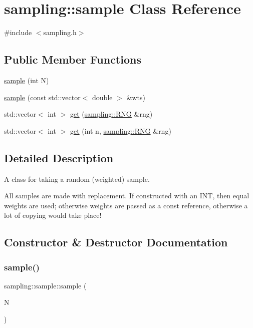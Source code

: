 \hypertarget{classsampling_1_1sample}{}\section{sampling\+:\+:sample Class Reference}
\label{classsampling_1_1sample}


{\ttfamily \#include $<$sampling.\+h$>$}

\subsection*{Public Member Functions}
\begin{DoxyCompactItemize}
\item 
\hyperlink{classsampling_1_1sample_a7c217cc7c5f9461835062a0362bec4d1}{sample} (int N)
\item 
\hyperlink{classsampling_1_1sample_aa5ce07807a24cd3387626b99b38255ad}{sample} (const std\+::vector$<$ double $>$ \&wts)
\item 
std\+::vector$<$ int $>$ \hyperlink{classsampling_1_1sample_addc486d8e1dca7d0a09be0a7fa95fc77}{get} (\hyperlink{classsampling_1_1RNG}{sampling\+::\+R\+NG} \&rng)
\item 
std\+::vector$<$ int $>$ \hyperlink{classsampling_1_1sample_ab2c4a10e7971983a8e4acdbb0ad37055}{get} (int n, \hyperlink{classsampling_1_1RNG}{sampling\+::\+R\+NG} \&rng)
\end{DoxyCompactItemize}


\subsection{Detailed Description}
A class for taking a random (weighted) sample.

All samples are made with replacement. If constructed with an I\+NT, then equal weights are used; otherwise weights are passed as a const reference, otherwise a lot of copying would take place! 

\subsection{Constructor \& Destructor Documentation}
\mbox{\label{classsampling_1_1sample_a7c217cc7c5f9461835062a0362bec4d1}} 
\subsubsection{\texorpdfstring{sample()}{sample()}\hspace{0.1cm}{\footnotesize\ttfamily [1/2]}}
{\footnotesize\ttfamily sampling\+::sample\+::sample (\begin{DoxyParamCaption}\item[{int}]{N }\end{DoxyParamCaption})}

